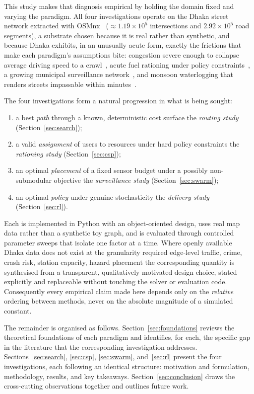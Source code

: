 \documentclass{ai-lab-report}
\begin{document}
This study makes that diagnosis empirical by holding the domain
fixed and varying the paradigm. All four investigations operate on
the Dhaka street network extracted with OSMnx~\cite{boeing2017osmnx}
($\approx 1.19 \times 10^{5}$ intersections and
$2.92 \times 10^{5}$ road segments), a substrate chosen because it
is real rather than synthetic, and because Dhaka exhibits, in an
unusually acute form, exactly the frictions that make each
paradigm's assumptions bite: congestion severe enough to collapse
average driving speed to a crawl~\cite{worldbank2018dhaka}, acute fuel
rationing under policy constraints~\cite{thewire2022fuel}, a growing
municipal surveillance network~\cite{tbs2023cctv}, and monsoon
waterlogging that renders streets impassable within
minutes~\cite{dailystar2025waterlogging}.

The four investigations form a natural progression in what is being
sought:
\begin{enumerate}
  \item a best \emph{path} through a known, deterministic cost
        surface  the \emph{routing study}
        (Section~\ref{sec:search});
  \item a valid \emph{assignment} of users to resources under hard
        policy constraints  the \emph{rationing study}
        (Section~\ref{sec:csp});
  \item an optimal \emph{placement} of a fixed sensor budget under
        a possibly non-submodular objective  the
        \emph{surveillance study} (Section~\ref{sec:swarm});
  \item an optimal \emph{policy} under genuine
        stochasticity  the \emph{delivery study}
        (Section~\ref{sec:rl}).
\end{enumerate}

Each is implemented in Python with an object-oriented design, uses
real map data rather than a synthetic toy graph, and is evaluated
through controlled parameter sweeps that isolate one factor at a
time. Where openly available Dhaka data does not exist at the
granularity required  edge-level traffic, crime, crash risk,
station capacity, hazard placement  the corresponding quantity is
synthesised from a transparent, qualitatively motivated design
choice, stated explicitly and replaceable without touching the
solver or evaluation code. Consequently every empirical claim made
here depends only on the \emph{relative} ordering between methods,
never on the absolute magnitude of a simulated constant.

The remainder is organised as follows.
Section~\ref{sec:foundations} reviews the theoretical foundations
of each paradigm and identifies, for each, the specific gap in the
literature that the corresponding investigation addresses.
Sections~\ref{sec:search}, \ref{sec:csp}, \ref{sec:swarm},
and~\ref{sec:rl} present the four investigations, each following an
identical structure: motivation and formulation, methodology,
results, and key takeaways. Section~\ref{sec:conclusion} draws the
cross-cutting observations together and outlines future work.
\end{document}
